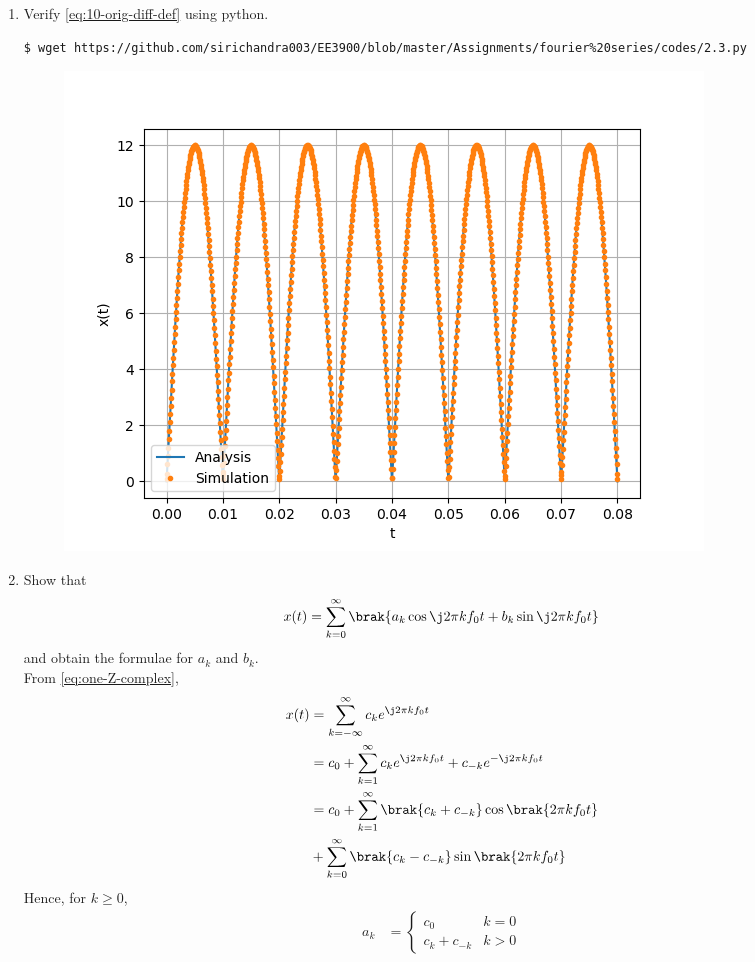 \documentclass[journal,12pt,twocolumn]{IEEEtran}
\renewcommand\thesection{\arabic{section}}
\begin{document}
\begin{enumerate}[label=\thesection.\arabic*,ref=\thesection.\theenumi]
\item Verify
\eqref{eq:10-orig-diff-def}
using python. \\
\solution
\begin{lstlisting}
$ wget https://github.com/sirichandra003/EE3900/blob/master/Assignments/fourier%20series/codes/2.3.py
\end{lstlisting}
\begin{figure}[!ht]
\includegraphics[width=\columnwidth]{figs/2.3.png}
\caption{}
\label{fig:ver-complex}
\end{figure}
\item Show that
\begin{align}
x(t) = \sum_{k = 0}^{\infty}\brak{a_k\cos{\j2\pi kf_0 t}+b_k\sin{\j2\pi kf_0 t}}
\label{eq:one-Z-real}
\end{align}
and obtain the formulae for $a_k$ and $b_k$. \\
\solution From \eqref{eq:one-Z-complex},
\begin{align}
x(t) &= \sum_{k = -\infty}^{\infty}c_ke^{\j2\pi kf_0 t} \\
&= c_0 + \sum_{k = 1}^{\infty}c_ke^{\j2\pi kf_0t} + c_{-k}e^{-\j2\pi kf_0t} \\
&= c_0 + \sum_{k = 1}^{\infty}\brak{c_k + c_{-k}}\cos\brak{2\pi kf_0t}  \nonumber \\
&+ \sum_{k = 0}^{\infty}\brak{c_k - c_{-k}}\sin\brak{2\pi kf_0t}
\end{align}
Hence, for $k \ge 0$,
\begin{align}
a_k &=
\begin{cases}
c_0 & k = 0 \\
c_k + c_{-k} & k > 0

\end{cases}
\end{align}
\end{enumerate}
\end{document}
